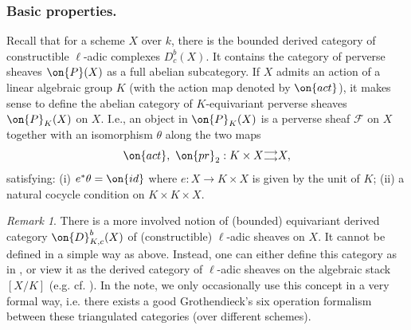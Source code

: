 \documentclass[]{pcmi}
\theoremstyle{plain}
\theoremstyle{remark}
\newtheorem{rmk}[equation]{Remark}
\theoremstyle{definition}
\newcommand{\mF}{{\mathcal F}}
\newcommand{\id}{{\on{id}}}
\newcommand{\pr}{{\on{pr}}}
\begin{document}
\subsubsection{Basic properties.} Recall that for a scheme $X$ over $k$, there is the bounded derived category of constructible $\ell$-adic complexes $D_c^b(X)$. It contains the category of perverse sheaves $\on{P}(X)$ as a full abelian subcategory. If $X$ admits an action of a linear algebraic group $K$ (with the action map denoted by $\on{act}$), it makes sense to define the abelian category of $K$-equivariant perverse sheaves $\on{P}_K(X)$ on $X$. I.e., an object in $\on{P}_K(X)$ is a perverse sheaf $\mF$ on $X$ together with an isomorphism $\theta$ along the two maps 
$$\on{act},\ \pr_2:K\times X\substack{\longrightarrow\\ \longrightarrow} X,$$ satisfying: (i) $e^*\theta=\id$ where $e:X\to K\times X$ is given by the unit of $K$; (ii) a natural cocycle condition on $K\times K\times X$. 
\begin{rmk}
There is a more involved notion of (bounded) equivariant derived category $\on{D}_{K,c}^b(X)$
of (constructible) $\ell$-adic sheaves on $X$. It  cannot be defined in a simple way as above. Instead, one can either define this category as in \cite{BeLu}, or view it as the derived category of $\ell$-adic sheaves on the algebraic stack $[X/K]$ (e.g. cf. \cite{LZ}). In the note, we only occasionally use this concept in a very formal way, i.e. there exists a good Grothendieck's six operation formalism between these triangulated categories (over different schemes). 
\end{rmk}
\end{document}
